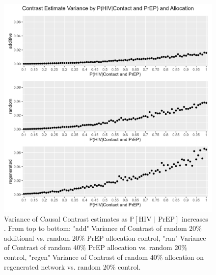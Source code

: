 \documentclass{article}
\theoremstyle{definition}
\begin{document}
\begin{figure}[H]
    \centering
    \includegraphics[scale=0.75]{Figures/p2 Variance plots.png}
    \caption{Variance of Causal Contrast estimates as $\mathbb{P}\left[\text{HIV } \vert \text{ PrEP}\right]$ increases .  From top to bottom: "add" Variance of Contrast of random 20\% additional vs. random 20\% PrEP allocation control, "ran" Variance of Contrast of random 40\% PrEP allocation vs. random 20\% control, "regen" Variance of Contrast of random 40\% allocation on regenerated network vs. random 20\% control.}
    \label{fig:Figure 16}
\end{figure}
\end{document}
